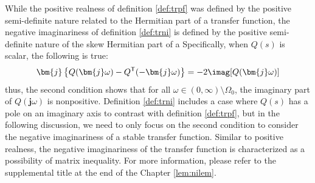 \documentclass[tombow,dvipdfmx]{corona-a5-1.1}
\begin{document}
While the positive realness of definition \ref{def:trpf} was defined by the positive semi-definite nature related to the Hermitian part of a transfer function, the negative imaginariness of definition \ref{def:trni} is defined by the positive semi-definite nature of the skew Hermitian part of a
Specifically, when $Q(s)$ is scalar, the following is true:
\begin{align*}
\bm{j}\left\{Q(\bm{j} \omega) - Q^{\sf T}(-\bm{j} \omega) \right\}
= -2 \imag[Q(\bm{j} \omega)]
\end{align*}
thus, the second condition shows that for all $\omega \in (0,\infty)\setminus \Omega_0$, the imaginary part of $Q(\bm{j}\omega)$ is nonpositive.
Definition \ref{def:trni} includes a case where $Q(s)$ has a pole on an imaginary axis to contrast with definition \ref{def:trpf}, but in the following discussion, we need to only focus on the second condition to consider the negative imaginariness of a stable transfer function.
Similar to positive realness, the negative imaginariness of the transfer function is characterized as a possibility of matrix inequality. 
For more information, please refer to the supplemental title at the end of the Chapter \ref{lem:nilem}.
\end{document}
